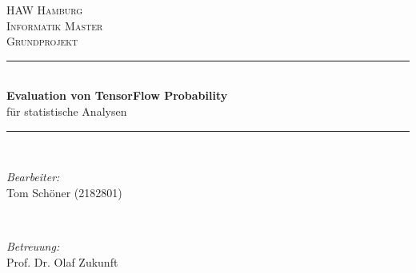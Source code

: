 \documentclass[12pt]{article}
\begin{document}
\begin{titlepage}

\newcommand{\HRule}{\rule{\linewidth}{0.5mm}} %

\begin{center}
 

\textsc{\LARGE HAW Hamburg}\\[0.5cm] %
\textsc{\LARGE Informatik Master}\\[1.5cm] %
\textsc{\Large Grundprojekt}\\[0.5cm] %


\HRule \\[0.4cm]

{ \large \bfseries Evaluation von TensorFlow Probability}\\[0.1cm]
{ \large für statistische Analysen}\\[0cm]

\HRule \\[2.0cm]


\begin{minipage}{\textwidth}
\begin{flushleft} \large
\emph{Bearbeiter:}\\
Tom Schöner (2182801) \linebreak
\end{flushleft}
\end{minipage}
~
\begin{minipage}{\textwidth}
\begin{flushleft} \large
\emph{Betreuung:} \\
Prof. Dr. Olaf Zukunft
\end{flushleft}
\end{minipage}\\[4cm]


\end{center}
\end{titlepage}
\end{document}
